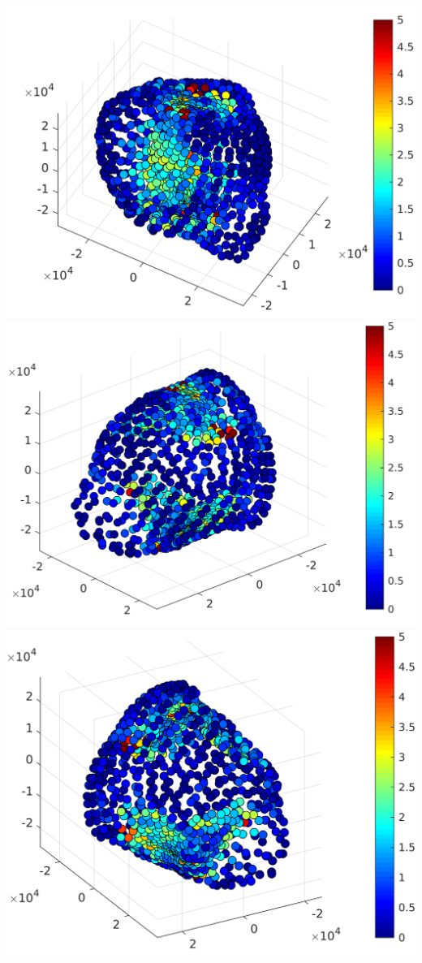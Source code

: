 \begin{center}
    \includegraphics[width=\linewidth]{rsc/self_3D_1.png}
    \includegraphics[width=\linewidth]{rsc/self_3D_2.png}
    \includegraphics[width=\linewidth]{rsc/self_3D_3.png}
    \label{fig:5.5}
\end{center}
